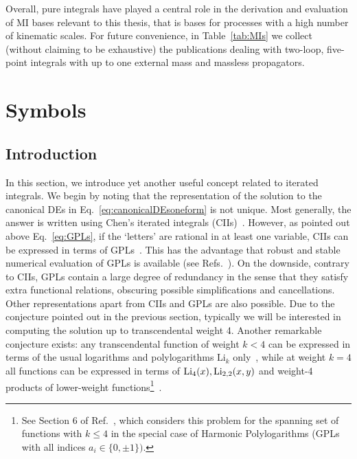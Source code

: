 \documentclass[main.tex]{subfiles}
\begin{document}
Overall, pure integrals have played a central role in the derivation and evaluation of MI bases relevant to this thesis, that is bases for processes with a high number of kinematic scales. For future convenience, in Table~\ref{tab:MIs} we collect (without claiming to be exhaustive) the publications dealing with two-loop, five-point integrals with up to one external mass and massless propagators.

\section{Symbols} \label{sec:symbols}
\subsection{Introduction}
In this section, we introduce yet another useful concept related to iterated integrals. We begin by noting that the representation of the solution to the canonical DEs in Eq.~\ref{eq:canonicalDEsoneform} is not unique. Most generally, the answer is written using Chen's iterated integrals (CIIs)~\cite{Chen:1977oja}. 
However, as pointed out above Eq.~\ref{eq:GPLs}, if the `letters' are rational in at least one variable, CIIs can be expressed in terms of GPLs~\cite{Henn:2014qga}. This has the advantage that robust and stable numerical evaluation of GPLs is available (see Refs.~\cite{Bauer:2000cp, Vollinga:2004sn, Panzer:2014caa}). On the downside, contrary to CIIs, GPLs contain a large degree of redundancy in the sense that they satisfy extra functional relations, obscuring possible simplifications and cancellations. Other representations apart from CIIs and GPLs are also possible. Due to the conjecture pointed out in the previous section, typically we will be interested in computing the solution up to transcendental weight 4. Another remarkable conjecture exists: any transcendental function of weight $k < 4$ can be expressed in terms of the usual logarithms and polylogarithms $\text{Li}_k$ only~\cite{MR1265551, Goncharov:2010jf}, while at weight $k=4$ all functions can be expressed in terms of $\text{Li}_4(x), \text{Li}_{2,2}(x,y)$ and weight-4 products of lower-weight functions\footnote{See Section 6 of Ref.~\cite{Duhr:2011zq}, which considers this problem for the spanning set of functions with $k\le4$ in the special case of Harmonic Polylogarithms (GPLs with all indices $a_i\in\{0,\pm1\})$.}~\cite{Henn:2014qga}. 
\end{document}
